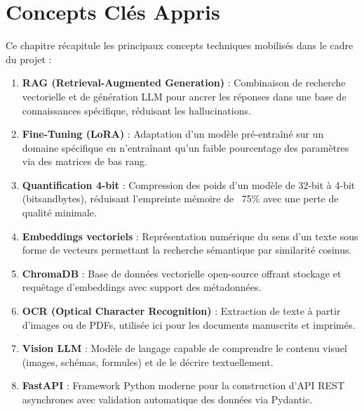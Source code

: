 \documentclass[12pt,a4paper]{report}
\begin{document}
\chapter{Concepts Clés Appris}

Ce chapitre récapitule les principaux concepts techniques mobilisés dans le cadre du projet :

\begin{enumerate}[label=\textbf{\arabic{.}}]
    \item \textbf{RAG (Retrieval-Augmented Generation)} : Combinaison de recherche vectorielle et de génération LLM pour ancrer les réponses dans une base de connaissances spécifique, réduisant les hallucinations.
    
    \item \textbf{Fine-Tuning (LoRA)} : Adaptation d'un modèle pré-entraîné sur un domaine spécifique en n'entraînant qu'un faible pourcentage des paramètres via des matrices de bas rang.
    
    \item \textbf{Quantification 4-bit} : Compression des poids d'un modèle de 32-bit à 4-bit (bitsandbytes), réduisant l'empreinte mémoire de ~75\% avec une perte de qualité minimale.
    
    \item \textbf{Embeddings vectoriels} : Représentation numérique du sens d'un texte sous forme de vecteurs permettant la recherche sémantique par similarité cosinus.
    
    \item \textbf{ChromaDB} : Base de données vectorielle open-source offrant stockage et requêtage d'embeddings avec support des métadonnées.
    
    \item \textbf{OCR (Optical Character Recognition)} : Extraction de texte à partir d'images ou de PDFs, utilisée ici pour les documents manuscrits et imprimés.
    
    \item \textbf{Vision LLM} : Modèle de langage capable de comprendre le contenu visuel (images, schémas, formules) et de le décrire textuellement.
    
    \item \textbf{FastAPI} : Framework Python moderne pour la construction d'API REST asynchrones avec validation automatique des données via Pydantic.
    

\end{enumerate}
\end{document}
